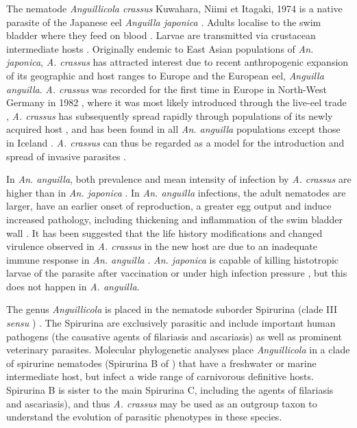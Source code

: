 \documentclass[10pt]{bmc_article}
\newenvironment{bmcformat}{\begin{raggedright}\baselineskip20pt\sloppy\setboolean{publ}{false}}{\end{raggedright}\baselineskip20pt\sloppy}
\begin{document}
\begin{bmcformat}
The nematode \textit{Anguillicola crassus} Kuwahara, Niimi et Itagaki,
1974 is a native parasite of the Japanese eel \textit{Anguilla
  japonica} \cite{kuwahara_Niimi_Itagaki_1974}. Adults localise to the
swim bladder where they feed on blood
\cite{polzer_identification_1993}. Larvae are transmitted via
crustacean intermediate hosts
\cite{de_charleroy_life_1990}. Originally endemic to East Asian
populations of \textit{An. japonica}, \textit{A. crassus} has
attracted interest due to recent anthropogenic expansion of its
geographic and host ranges to Europe and the European eel,
\textit{Anguilla anguilla}. \textit{A. crassus} was recorded for the
first time in Europe in North-West Germany in 1982
\cite{fischer_teichwirt}, where it was most likely introduced through
the live-eel trade \cite{koops_anguillicola-infestations_1989,
  koie_swimbladder_1991}, \textit{A. crassus} has subsequently spread
rapidly through populations of its newly acquired host
\cite{kirk_impact_2003}, and has been found in all
\textit{An. anguilla} populations except those in Iceland
\cite{kristmundsson_parasite_2007}. \textit{A. crassus} can thus be
regarded as a model for the introduction and spread of invasive
parasites \cite{taraschewski_hosts_2007}.

In \textit{An. anguilla}, both prevalence and mean intensity of
infection by \textit{A. crassus} are higher than in \textit{
  An. japonica} \cite{mnderle_occurrence_2006,
  lefebvre_anguillicolosis:_2004}. In \textit{An.  anguilla}
infections, the adult nematodes are larger, have an earlier onset of
reproduction, a greater egg output \cite{knopf_differences_2004} and
induce increased pathology, including thickening and inflammation of
the swim bladder wall \cite{wurtz_tara_2000}. It has been suggested
that the life history modifications and changed virulence observed in
\textit{A. crassus} in the new host are due to an inadequate immune
response in \textit{An. anguilla}
\cite{knopf_swimbladder_2006}. \textit{An. japonica} is capable of
killing histotropic larvae of the parasite after vaccination
\cite{knopf_vaccination_2008} or under high infection pressure
\cite{heitlinger_massive_2009}, but this does not happen in
\textit{A. anguilla}.

The genus \textit{Anguillicola} is placed in the nematode suborder
Spirurina (clade III \textit{sensu} \cite{blaxter_molecular_1998})
\cite{nadler_molecular_2007, wijov_evolutionary_2006}. The Spirurina
are exclusively parasitic and include important human pathogens (the
causative agents of filariasis and ascariasis) as well as prominent
veterinary parasites. Molecular phylogenetic analyses place
\textit{Anguillicola} in a clade of spirurine nematodes (Spirurina B
of \cite{dl_py}) that have a freshwater or marine intermediate host,
but infect a wide range of carnivorous definitive hosts. Spirurina B
is sister to the main Spirurina C, including the agents of filariasis
and ascariasis), and thus \textit{A. crassus} may be used as an
outgroup taxon to understand the evolution of parasitic phenotypes in
these species.


\end{bmcformat}
\end{document}
